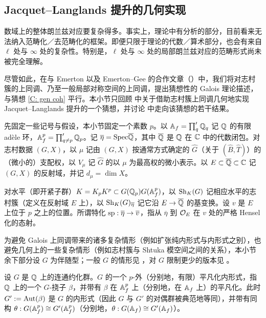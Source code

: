
\subsection{Jacquet--Langlands 提升的几何实现}\label{geometric JL}

数域上的整体朗兰兹对应要复杂得多。事实上，理论中有分析的部分，目前看来无法纳入范畴化／去范畴化的框架。即便只限于理论的代数／算术部分，也会有来自 $\ell$ 处与 $\infty$ 处的复杂性。特别是，$\ell$ 处与 $\infty$ 处的局部朗兰兹对应的范畴形式尚未被完全理解。

尽管如此，在与 Emerton 以及 Emerton--Gee 的合作文章（\cite{Emerton-Zhu, Emerton-Gee-Zhu}）中，我们将对志村簇的上同调、乃至一般局部对称空间的上同调，提出猜想性的 Galois 理论描述，与猜想 \ref{C: gen coh} 平行。本小节只回顾 \cite{Zhu-Conjecture} 中关于借助志村簇上同调几何地实现 Jacquet--Langlands 提升的一个猜想，并讨论 \cite{Xiao-Zhu-Cycle, Hemo-Zhu-Unipotent} 中走向该猜想的若干结果。

先固定一些记号与假设，本小节固定一个素数 $p$。以 ${\mathbb A}_f=\prod'_q{\mathbb Q}_q$ 记 ${\mathbb Q}$ 的有限 adèle 环，${\mathbb A}_f^p=\prod'_{q\neq p}{\mathbb Q}_p$。记 $\overline\eta={\operatorname{Spec}} \overline{{\mathbb Q}}$，其中 $\overline{{\mathbb Q}}$ 是 ${\mathbb Q}$ 在 ${\mathbb C}$ 中的代数闭包。对志村数据 $(G,X)$，以 $\mu$ 记由 $(G,X)$ 按通常方式确定的 $\hat{G}$（关于 $(\hat{B},\hat{T})$）的（微小的）支配权，以 $V_\mu$ 记 $\hat{G}$ 的以 $\mu$ 为最高权的微小表示。以 $E\subset\overline{{\mathbb Q}}\subset{\mathbb C}$ 记 $(G,X)$ 的反射域，并记 $d_\mu=\dim X$。

对水平（即开紧子群）$K=K_pK^p\subset G({\mathbb Q}_p)G({\mathbb A}_f^p)$，以 ${\operatorname{Sh}}_K(G)$ 记相应水平的志村簇（定义在反射域 $E$ 上），以 ${\operatorname{Sh}}_K(G)_{\overline\eta}$ 记它沿 $E\to \overline{{\mathbb Q}}$ 的基变换。设 $v$ 是 $E$ 上位于 $p$ 之上的位置。所谓特化 $\operatorname{sp}: \overline\eta\to \overline{v}$，指从 $\overline\eta$ 到 ${\mathcal O}_E$ 在 $v$ 处的严格 Hensel 化的态射。

为避免 Galois 上同调带来的诸多复杂情形（例如扩张纯内形式与内形式之别），也避免几何上的一些复杂情形（例如志村簇与 Shtuka 模空间之间的关系），本小节余下部分设 $G$ 为伴随型；一般 $G$ 的情形见 \cite{Xiao-Zhu-Cycle}，对 $G$ 限制更少的版本见 \cite{Zhu-Conjecture}。

\begin{dfn}\label{D: prime-to-p trivial}
设 $G$ 是 ${\mathbb Q}$ 上的连通约化群。$G$ 的一个 $p$-外（分别地，有限）平凡化内形式，指 ${\mathbb Q}$ 上的一个 $G$-挠子 $\beta$，并带有 $\beta$ 在 ${\mathbb A}_f^p$ 上（分别地，在 ${\mathbb A}_f$ 上）的平凡化。此时 $G':={\operatorname{Aut}}(\beta)$ 是 $G$ 的内形式（因此 $G$ 与 $G'$ 的对偶群被典范地等同），并带有同构 $\theta: G({\mathbb A}^p_f)\cong G'({\mathbb A}^p_f)$（分别地，$\theta: G({\mathbb A}_f)\cong G'({\mathbb A}_f)$）。
\end{dfn}

